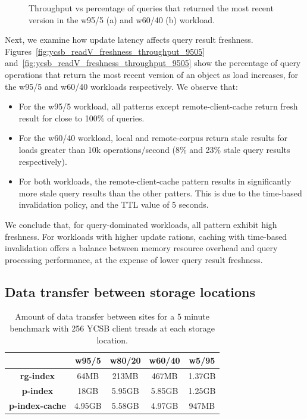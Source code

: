 \begin{figure}[H]
\begin{subfigure}{0.5\textwidth}
    \caption{}
    \label{fig:ycsb_readV_freshness_throughput_6040}
  \end{subfigure}%
  \caption{Throughput vs percentage of queries that returned the most recent version in the w95/5 (a) and w60/40 (b) workload.}
  \label{fig:ycsb_readV_freshness_throughput}
\end{figure}

Next, we examine how update latency affects query result freshness.
Figures~\ref{fig:ycsb_readV_freshness_throughput_9505} and~\ref{fig:ycsb_readV_freshness_throughput_9505} show
the percentage of query operations that return the most recent version of an object as load increases,
for the w95/5 and w60/40 workloads respectively.
We observe that:
\begin{itemize}
  \item For the w95/5 workload, all patterns except remote-client-cache return fresh result for close to 100\% of queries.

  \item For the w60/40 workload, local and remote-corpus return stale results for loads greater than 10k operations/second
  (8\% and 23\% stale query results respectively).

  \item For both workloads, the remote-client-cache pattern results in significantly more stale query results than the other
  patters.
  This is due to the time-based invalidation policy, and the TTL value of 5 seconds.
\end{itemize}

We conclude that, for query-dominated workloads, all pattern exhibit high freshness.
For workloads with higher update rations,
caching with time-based invalidation offers a balance between memory resource overhead and query processing performance,
at the expense of lower query result freshness.

\subsection{Data transfer between storage locations}

\begin{table}[H]
\centering
\begin{tabular}{|c||c|c|c|c||}
\hline
& \textbf{w95/5} & \textbf{w80/20} & \textbf{w60/40} & \textbf{w5/95}\\
\hline
\textbf{rg-index} & 64MB & 213MB & 467MB & 1.37GB \\
\hline
\textbf{p-index} & 18GB & 5.95GB & 5.85GB & 1.25GB \\
\hline
\textbf{p-index-cache} & 4.95GB & 5.58GB & 4.97GB & 947MB \\
\hline
\end{tabular}
\caption{Amount of data transfer between sites for a 5 minute benchmark with 256 YCSB client treads at each storage location.}
\label{tab:ycsb_data_transfer}
\end{table}

